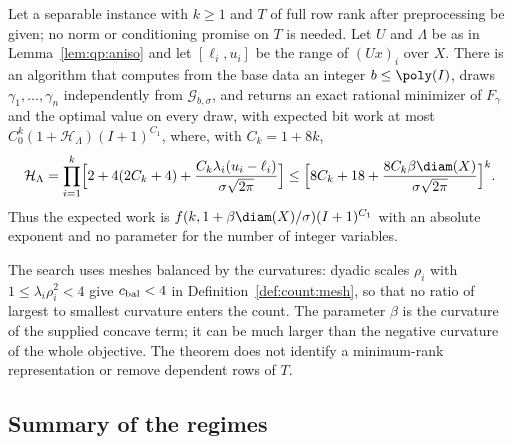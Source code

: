 \begin{theorem}\label{thm:qp:sep-gauss}
Let a separable instance with $k\ge1$ and $T$ of full row rank after
preprocessing be given; no norm or conditioning promise on $T$ is needed. Let
$U$ and $\Lambda$ be as in Lemma~\ref{lem:qp:aniso} and let $[\ell_i,u_i]$ be
the range of $(Ux)_i$ over $X$. There is an algorithm that computes from the
base data an integer $b\le\poly(I)$, draws $\gamma_1,\dots,\gamma_n$
independently from $\mathcal G_{b,\sigma}$, and returns an exact rational
minimizer of $F_\gamma$ and the optimal value on every draw, with expected bit
work at most $C_0^k(1+\mathcal H_\Lambda)(I+1)^{C_1}$, where, with
$C_k=1+8k$,
\[
 \mathcal H_\Lambda=\prod_{i=1}^k\Bigl[2+4(2C_k+4)+\frac{C_k\lambda_i(u_i-\ell_i)}{\sigma\sqrt{2\pi}}\Bigr]
 \le\Bigl[8C_k+18+\frac{8C_k\beta\diam(X)}{\sigma\sqrt{2\pi}}\Bigr]^k .
\]
Thus the expected work is $f(k,1+\beta\diam(X)/\sigma)(I+1)^{C_1}$ with an
absolute exponent and no parameter for the number of integer variables.
\end{theorem}

The search uses meshes balanced by the curvatures: dyadic scales $\rho_i$
with $1\le\lambda_i\rho_i^2<4$ give $c_{\rm bal}<4$ in
Definition~\ref{def:count:mesh}, so that no ratio of largest to smallest
curvature enters the count. The parameter $\beta$ is the curvature of the
supplied concave term; it can be much larger than the negative curvature of
the whole objective. The theorem does not identify a minimum-rank
representation or remove dependent rows of $T$.

\subsection{Summary of the regimes}\label{sec:qp:summary}

